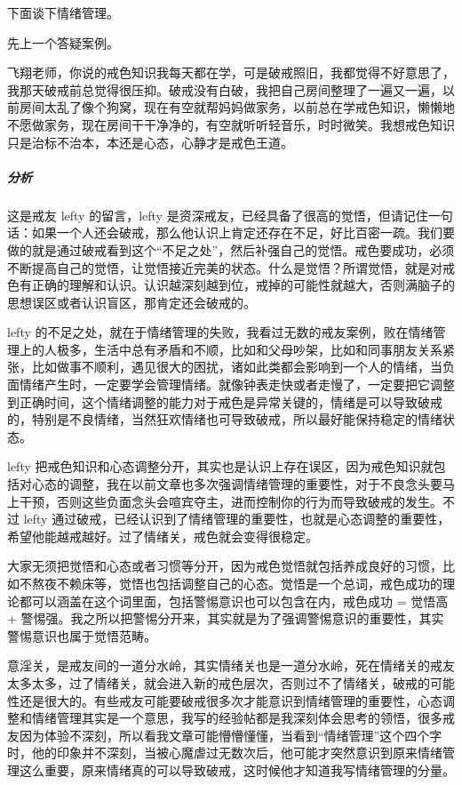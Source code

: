 下面谈下情绪管理。

先上一个答疑案例。

\begin{case}
    飞翔老师，你说的戒色知识我每天都在学，可是破戒照旧，我都觉得不好意思了，我那天破戒前总觉得很压抑。破戒没有白破，我把自己房间整理了一遍又一遍，以前房间太乱了像个狗窝，现在有空就帮妈妈做家务，以前总在学戒色知识，懒懒地不愿做家务，现在房间干干净净的，有空就听听轻音乐，时时微笑。我想戒色知识只是治标不治本，本还是心态，心静才是戒色王道。
    \subparagraph{分析} 这是戒友 lefty 的留言，lefty 是资深戒友，已经具备了很高的觉悟，但请记住一句话：如果一个人还会破戒，那么他认识上肯定还存在不足，好比百密一疏。我们要做的就是通过破戒看到这个“不足之处”，然后补强自己的觉悟。戒色要成功，必须不断提高自己的觉悟，让觉悟接近完美的状态。什么是觉悟？所谓觉悟，就是对戒色有正确的理解和认识。认识越深刻越到位，戒掉的可能性就越大，否则满脑子的思想误区或者认识盲区，那肯定还会破戒的。

    lefty 的不足之处，就在于情绪管理的失败，我看过无数的戒友案例，败在情绪管理上的人极多，生活中总有矛盾和不顺，比如和父母吵架，比如和同事朋友关系紧张，比如做事不顺利，遇见很大的困扰，诸如此类都会影响到一个人的情绪，当负面情绪产生时，一定要学会管理情绪。就像钟表走快或者走慢了，一定要把它调整到正确时间，这个情绪调整的能力对于戒色是异常关键的，情绪是可以导致破戒的，特别是不良情绪，当然狂欢情绪也可导致破戒，所以最好能保持稳定的情绪状态。

    lefty 把戒色知识和心态调整分开，其实也是认识上存在误区，因为戒色知识就包括对心态的调整，我在以前文章也多次强调情绪管理的重要性，对于不良念头要马上干预，否则这些负面念头会喧宾夺主，进而控制你的行为而导致破戒的发生。不过 lefty 通过破戒，已经认识到了情绪管理的重要性，也就是心态调整的重要性，希望他能越戒越好。过了情绪关，戒色就会变得很稳定。
\end{case}

大家无须把觉悟和心态或者习惯等分开，因为戒色觉悟就包括养成良好的习惯，比如不熬夜不赖床等，觉悟也包括调整自己的心态。觉悟是一个总词，戒色成功的理论都可以涵盖在这个词里面，包括警惕意识也可以包含在内，戒色成功 = 觉悟高 + 警惕强。我之所以把警惕分开来，其实就是为了强调警惕意识的重要性，其实警惕意识也属于觉悟范畴。

意淫关，是戒友间的一道分水岭，其实情绪关也是一道分水岭，死在情绪关的戒友太多太多，过了情绪关，就会进入新的戒色层次，否则过不了情绪关，破戒的可能性还是很大的。有些戒友可能要破戒很多次才能意识到情绪管理的重要性，心态调整和情绪管理其实是一个意思，我写的经验帖都是我深刻体会思考的领悟，很多戒友因为体验不深刻，所以看我文章可能懵懵懂懂，当看到“情绪管理”这个四个字时，他的印象并不深刻，当被心魔虐过无数次后，他可能才突然意识到原来情绪管理这么重要，原来情绪真的可以导致破戒，这时候他才知道我写情绪管理的分量。

